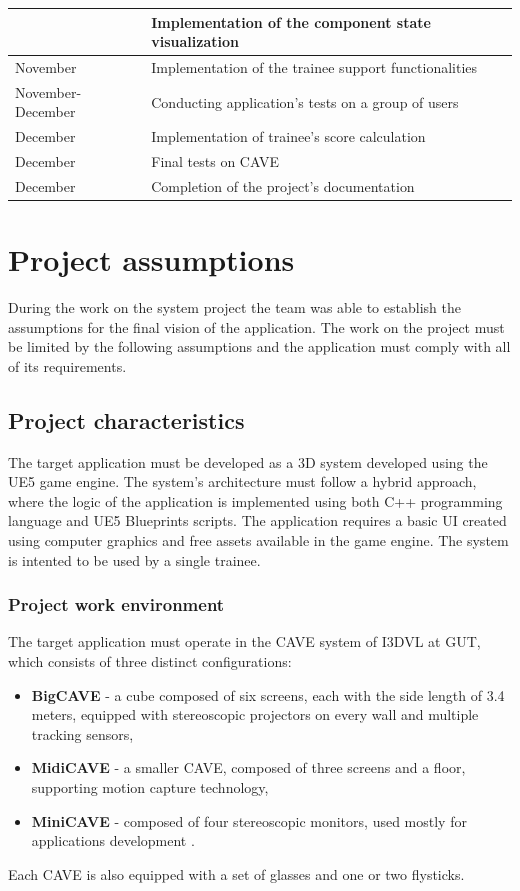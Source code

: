 \begin{table}[H]
\begin{tabular}{|p{}|p{}|}
    & Implementation of the component state visualization
    \\\hline
    November
    & Implementation of the trainee support functionalities
    \\\hline
    November-December
    & Conducting application's tests on a group of users
    \\\hline
    December
    & Implementation of trainee's score calculation
    \\\hline
    December
    & Final tests on CAVE
    \\\hline
    December
    & Completion of the project's documentation
    \\\hline
\end{tabular}
\end{table}

\section{Project assumptions}
During the work on the system project the team was able to establish the assumptions for the final vision of the application.
The work on the project must be limited by the following assumptions and the application must comply with all of its requirements.
\subsection{Project characteristics}
The target application must be developed as a 3D system developed using the UE5 game engine.
The system's architecture must follow a hybrid approach, where the logic of the application is implemented using both C++ programming language and UE5 Blueprints scripts.
The application requires a basic UI created using computer graphics and free assets available in the game engine.
The system is intented to be used by a single trainee.
\subsubsection{Project work environment}
The target application must operate in the CAVE system of I3DVL at GUT, which consists of three distinct configurations:
\begin{itemize}
    \item \textbf{BigCAVE} - a cube composed of six screens, each with the side length of 3.4 meters, equipped with stereoscopic projectors on every wall and multiple tracking sensors,
    \item \textbf{MidiCAVE} - a smaller CAVE, composed of three screens and a floor, supporting motion capture technology,
    \item \textbf{MiniCAVE} - composed of four stereoscopic monitors, used mostly for applications development \cite{PG_ABOUT_CAVE}.
\end{itemize}
Each CAVE is also equipped with a set of glasses and one or two flysticks.
